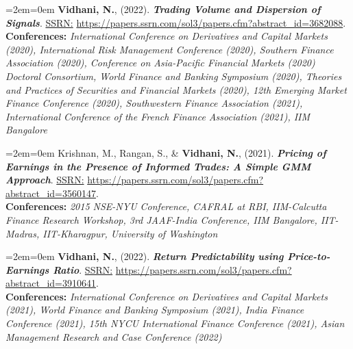 \documentclass[11pt,a4paper,]{moderncv}
\begin{document}
  \par
  \medskip
  \leftskip=2em\rightskip=0em
  \noindent\ignorespaces
\textbf{Vidhani, N.}, (2022). \textbf{\textit{Trading Volume and Dispersion of Signals}}. \underline{SSRN:} \url{https://papers.ssrn.com/sol3/papers.cfm?abstract_id=3682088}.\\
\textbf{Conferences:} \textit{International Conference on Derivatives and Capital Markets (2020), International Risk Management Conference (2020), Southern Finance Association (2020), Conference on Asia-Pacific Financial Markets (2020) Doctoral Consortium, World Finance and Banking Symposium (2020), Theories and Practices of Securities and Financial Markets (2020), 12th Emerging Market Finance Conference (2020), Southwestern Finance Association (2021), International Conference of the French Finance Association (2021), IIM Bangalore}\\
  \par\medskip

  \par
  \medskip
  \leftskip=2em\rightskip=0em
  \noindent\ignorespaces
Krishnan, M., Rangan, S., \& \textbf{Vidhani, N.}, (2021). \textbf{\textit{Pricing of Earnings in the Presence of Informed Trades: A Simple GMM Approach}}. \underline{SSRN:} \url{https://papers.ssrn.com/sol3/papers.cfm?abstract_id=3560147}.\\
\textbf{Conferences:} \textit{2015 NSE-NYU Conference, CAFRAL at RBI, IIM-Calcutta Finance Research Workshop, 3rd JAAF-India Conference, IIM Bangalore, IIT-Madras, IIT-Kharagpur, University of Washington}\\
  \par\medskip

  \par
  \medskip
  \leftskip=2em\rightskip=0em
  \noindent\ignorespaces
\textbf{Vidhani, N.}, (2022). \textbf{\textit{Return Predictability using
Price-to-Earnings Ratio}}. \underline{SSRN:} \url{https://papers.ssrn.com/sol3/papers.cfm?abstract_id=3910641}.\\
\textbf{Conferences:} \textit{International Conference on Derivatives and Capital Markets (2021), World Finance and Banking Symposium (2021), India Finance Conference (2021), 15th NYCU International Finance Conference (2021), Asian Management Research and Case Conference (2022)}\\
  \par\medskip

\endgroup
\end{document}
